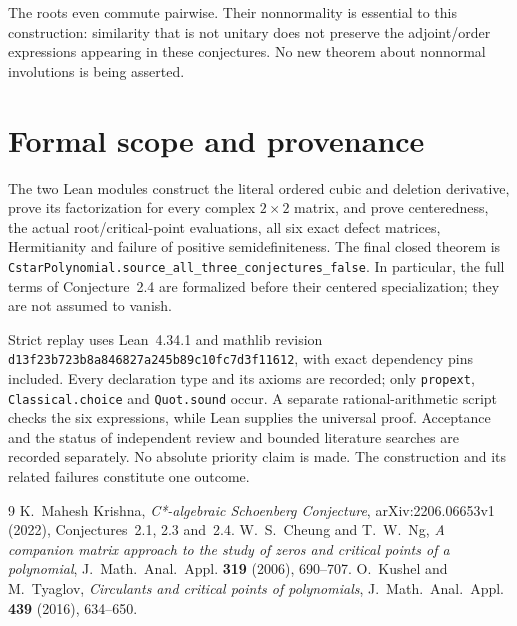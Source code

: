 \documentclass[11pt]{article}
\begin{document}
The roots even commute pairwise. Their nonnormality is essential to
this construction: similarity that is not unitary does not preserve
the adjoint/order expressions appearing in these conjectures.
No new theorem about nonnormal involutions is being asserted.

\section{Formal scope and provenance}
The two Lean modules construct the literal ordered cubic and deletion
derivative, prove its factorization for every complex $2\times2$ matrix,
and prove centeredness, the actual root/critical-point evaluations,
all six exact defect matrices, Hermitianity and failure of positive
semidefiniteness. The final closed theorem is
\texttt{CstarPolynomial.source\_all\_three\_conjectures\_false}.
In particular, the full terms of Conjecture~2.4 are formalized before
their centered specialization; they are not assumed to vanish.

Strict replay uses Lean~4.34.1 and mathlib revision
\texttt{d13f23b723b8a846827a245b89c10fc7d3f11612},
with exact dependency pins included. Every declaration type and its
axioms are recorded; only \texttt{propext}, \texttt{Classical.choice}
and \texttt{Quot.sound} occur. A separate rational-arithmetic script
checks the six expressions, while Lean supplies the universal proof.
Acceptance and the status of independent review and bounded literature
searches are recorded separately. No absolute priority claim is made.
The construction and its related failures constitute one outcome.

\begin{thebibliography}{9}
 K.~Mahesh Krishna,
\emph{C*-algebraic Schoenberg Conjecture},
arXiv:2206.06653v1 (2022), Conjectures~2.1, 2.3 and~2.4.
 W.~S.~Cheung and T.~W.~Ng,
\emph{A companion matrix approach to the study of zeros and critical
points of a polynomial}, J.~Math.~Anal.~Appl. \textbf{319} (2006), 690--707.
 O.~Kushel and M.~Tyaglov,
\emph{Circulants and critical points of polynomials},
J.~Math.~Anal.~Appl. \textbf{439} (2016), 634--650.
\end{thebibliography}
\end{document}
